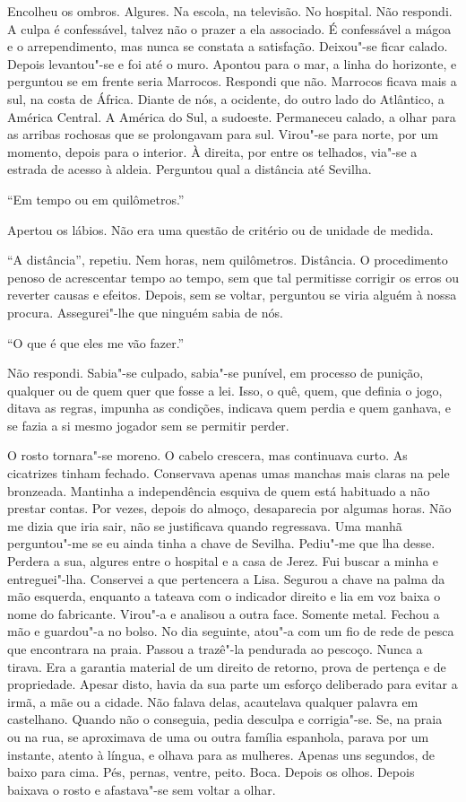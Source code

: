 Encolheu os ombros. Algures. Na escola, na televisão. No hospital. Não
respondi. A culpa é confessável, talvez não o prazer a ela associado. É
confessável a mágoa e o arrependimento, mas nunca se constata a
satisfação. Deixou"-se ficar calado. Depois levantou"-se e foi até o
muro. Apontou para o mar, a linha do horizonte, e perguntou se em frente
seria Marrocos. Respondi que não. Marrocos ficava mais a sul, na costa
de África. Diante de nós, a ocidente, do outro lado do Atlântico, a
América Central. A América do Sul, a sudoeste. Permaneceu calado, a
olhar para as arribas rochosas que se prolongavam para sul. Virou"-se
para norte, por um momento, depois para o interior. À direita, por entre
os telhados, via"-se a estrada de acesso à aldeia. Perguntou qual a
distância até Sevilha.

``Em tempo ou em quilômetros.''

Apertou os lábios. Não era uma questão de critério ou de unidade de
medida.

``A distância'',
repetiu. Nem horas, nem quilômetros. Distância. O procedimento penoso de
acrescentar tempo ao tempo, sem que tal permitisse corrigir os erros ou
reverter causas e efeitos. Depois, sem se voltar, perguntou se viria
alguém à nossa procura. Assegurei"-lhe que ninguém sabia de nós.

``O que é que eles me vão fazer.''

Não respondi. Sabia"-se culpado, sabia"-se punível, em processo de
punição, qualquer ou de quem quer que fosse a lei. Isso, o quê, quem,
que definia o jogo, ditava as regras, impunha as condições, indicava
quem perdia e quem ganhava, e se fazia a si mesmo jogador sem se
permitir perder.

O rosto tornara"-se moreno. O cabelo crescera, mas continuava curto. As
cicatrizes tinham fechado. Conservava apenas umas manchas mais claras na
pele bronzeada. Mantinha a independência esquiva de quem está habituado
a não prestar contas. Por vezes, depois do almoço, desaparecia por
algumas horas. Não me dizia que iria sair, não se justificava quando
regressava. Uma manhã perguntou"-me se eu ainda tinha a chave de
Sevilha. Pediu"-me que lha desse. Perdera a sua, algures entre o
hospital e a casa de Jerez. Fui buscar a minha e entreguei"-lha.
Conservei a que pertencera a Lisa. Segurou a chave na palma da mão
esquerda, enquanto a tateava com o indicador direito e lia em voz baixa
o nome do fabricante. Virou"-a e analisou a outra face. Somente metal.
Fechou a mão e guardou"-a no bolso. No dia seguinte, atou"-a com um fio
de rede de pesca que encontrara na praia. Passou a trazê"-la pendurada
ao pescoço. Nunca a tirava. Era a garantia material de um direito de
retorno, prova de pertença e de propriedade. Apesar disto, havia da sua
parte um esforço deliberado para evitar a irmã, a mãe ou a cidade. Não
falava delas, acautelava qualquer palavra em castelhano. Quando não o
conseguia, pedia desculpa e corrigia"-se. Se, na praia ou na rua, se
aproximava de uma ou outra família espanhola, parava por um instante,
atento à língua, e olhava para as mulheres. Apenas uns segundos, de
baixo para cima. Pés, pernas, ventre, peito. Boca. Depois os olhos.
Depois baixava o rosto e afastava"-se sem voltar a olhar.

